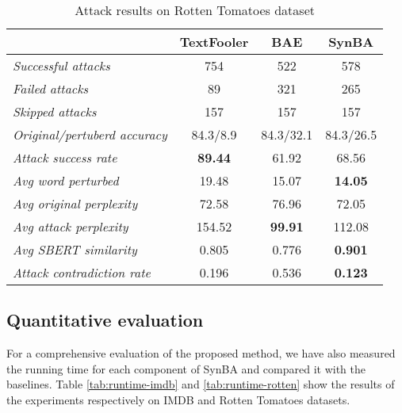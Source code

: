 \begin{table}[h]
    \footnotesize
    \centering
    \begin{tabular}{|l|c|c|c|}
        \hline
        {} &           \textbf{TextFooler} &   \textbf{BAE} &    \textbf{SynBA} \\
        \hline \hline
        \emph{Successful attacks}           &    754 &   522                &         578 \\
        \emph{Failed  attacks}              &     89 &   321                &         265 \\
        \emph{Skipped  attacks }            &    157 &   157                &         157 \\
        \emph{Original/pertuberd accuracy}  &   84.3/8.9 &  84.3/32.1       &  84.3/26.5 \\
        \emph{Attack success rate}          &   \textbf{89.44} &     61.92  &    68.56 \\
        \emph{Avg word perturbed }          &   19.48 &     15.07           &    \textbf{14.05} \\
        \emph{Avg original perplexity }     &   72.58 &     76.96           &    72.05 \\
        \emph{Avg attack perplexity}        &  154.52 &     \textbf{99.91}  &   112.08 \\
        \emph{Avg SBERT similarity }        &   0.805 &     0.776           &    \textbf{0.901} \\
        \emph{Attack contradiction rate}    &   0.196 &     0.536           &    \textbf{0.123} \\
        \hline
        \end{tabular}

    \caption{Attack results on Rotten Tomatoes dataset}
    \label{tab:results-rotten}
\end{table}





\subsection{Quantitative evaluation}\label{subsec:quantitative-evaluation}

For a comprehensive evaluation of the proposed method, we have also measured the running time for each component of SynBA and compared it with the baselines.
Table \ref{tab:runtime-imdb} and \ref{tab:runtime-rotten}  show the results of the experiments respectively on IMDB and Rotten Tomatoes datasets.

